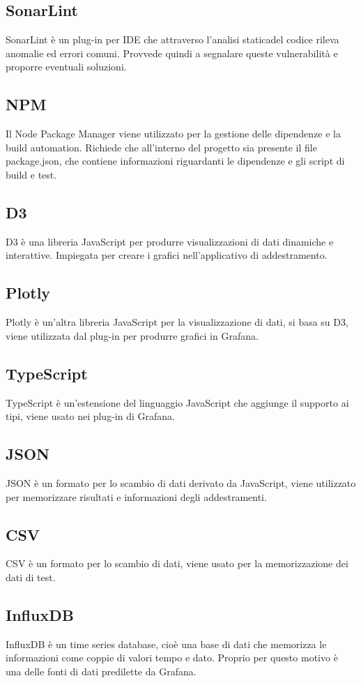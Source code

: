 	\subsection{SonarLint}
		SonarLint è un plug-in per IDE che attraverso l'analisi statica\glosp del codice rileva anomalie ed errori comuni. Provvede quindi a segnalare queste vulnerabilità e proporre eventuali soluzioni.
	\subsection{NPM}
		Il Node Package Manager viene utilizzato per la gestione delle dipendenze e la build automation.
		Richiede che all'interno del progetto sia presente il file package.json, che contiene informazioni riguardanti le dipendenze e gli script di build e test.
	\subsection{D3}
		D3 è una libreria JavaScript per produrre visualizzazioni di dati dinamiche e interattive. Impiegata per creare i grafici nell'applicativo di addestramento.
	\subsection{Plotly}
		Plotly è un'altra libreria JavaScript per la visualizzazione di dati, si basa su D3, viene utilizzata dal plug-in per produrre grafici in Grafana\glo.
	\subsection{TypeScript}
		TypeScript è un'estensione del linguaggio JavaScript che aggiunge il supporto ai tipi, viene usato nei plug-in di Grafana\glo.
	\subsection{JSON}
		JSON è un formato per lo scambio di dati derivato da JavaScript, viene utilizzato per memorizzare risultati e informazioni degli addestramenti.
	\subsection{CSV}
		CSV è un formato per lo scambio di dati, viene usato per la memorizzazione dei dati di test.
	\subsection{InfluxDB}
		InfluxDB è un time series database, cioè una base di dati che memorizza le informazioni come coppie di valori tempo e dato. Proprio per questo motivo è una delle fonti di dati predilette da Grafana\glo.
